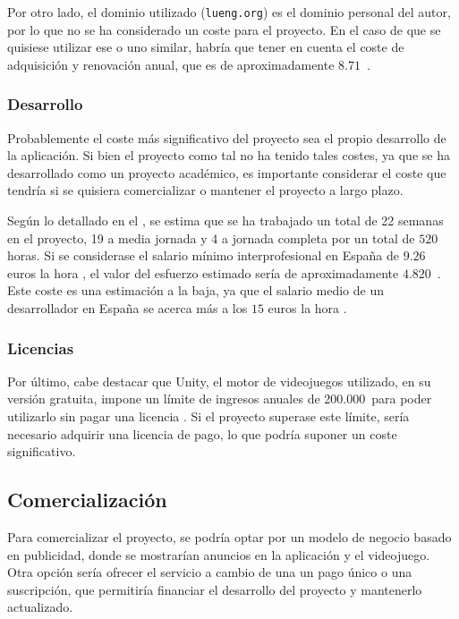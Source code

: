 
Por otro lado, el dominio utilizado (\texttt{lueng.org}) es el dominio personal
del autor, por lo que no se ha considerado un coste para el proyecto. En el caso
de que se quisiese utilizar ese o uno similar, habría que tener en cuenta el
coste de adquisición y renovación anual, que es de aproximadamente
$8.71$\texteuro\ .

\subsubsection{Desarrollo}
Probablemente el coste más significativo del proyecto sea el propio desarrollo de la aplicación.
Si bien el proyecto como tal no ha tenido tales costes, ya que se ha desarrollado como un proyecto
académico, es importante considerar el coste que tendría si se quisiera comercializar o mantener
el proyecto a largo plazo.

Según lo detallado en el \tercerAnexo, se estima que se ha trabajado un total de 22 semanas en
el proyecto, 19 a media jornada y 4 a jornada completa por un total de $520$ horas. Si se
considerase el salario mínimo interprofesional en España de $9.26$ euros la hora
\parencite{salarioMinimo}, el valor del esfuerzo estimado sería de aproximadamente
$4.820$\texteuro\ . Este coste es una estimación a la baja, ya que el salario medio de un
desarrollador en España se acerca más a los $15$ euros la hora \parencite{IndeedSueldoInformatico}.

\subsubsection{Licencias}
Por último, cabe destacar que Unity, el motor de videojuegos utilizado, en su versión gratuita,
impone un límite de ingresos anuales de 200.000\texteuro\ para poder utilizarlo sin pagar una licencia
\parencite{unityPlans}. Si el proyecto superase este límite, sería necesario adquirir una licencia
de pago, lo que podría suponer un coste significativo.


\subsection{Comercialización}
Para comercializar el proyecto, se podría optar por un modelo de negocio basado en publicidad,
donde se mostrarían anuncios en la aplicación y el videojuego. Otra opción sería ofrecer el servicio
a cambio de una un pago único o una suscripción, que permitiría financiar el desarrollo del proyecto
y mantenerlo actualizado.

